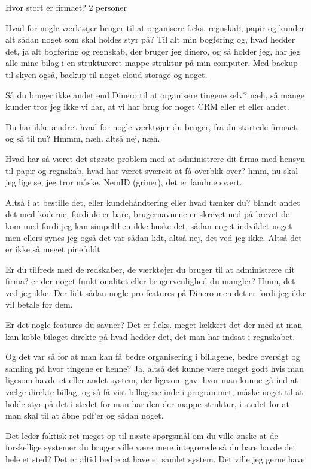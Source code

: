 Hvor stort er firmaet?
2 personer

Hvad for nogle værktøjer bruger til at organisere f.eks. regnskab, papir og kunder alt sådan noget som skal holdes styr på?
Til alt min bogføring og, hvad hedder det, ja alt bogføring og regnskab, der bruger jeg dinero, og så holder jeg, har jeg alle mine bilag i en struktureret mappe struktur på min computer. Med backup til skyen også, backup til noget cloud storage og noget.

Så du bruger ikke andet end Dinero til at organisere tingene selv?
næh, så mange kunder tror jeg ikke vi har, at vi har brug for noget CRM eller et eller andet.

Du har ikke ændret hvad for nogle værktøjer du bruger, fra du startede firmaet, og så til nu?
Hmmm, næh. altså nej, næh.

Hvad har så været det største problem med at administrere dit firma med hensyn til papir og regnskab, hvad har været sværest at få overblik over?
hmm, nu skal jeg lige se, jeg tror måske. NemID (griner), det er fandme svært.

Altså i at bestille det, eller kundehåndtering eller hvad tænker du?
blandt andet det med koderne, fordi de er bare, brugernavnene er skrevet ned på brevet de kom med fordi jeg kan simpelthen ikke huske det, sådan noget indviklet noget men ellers synes jeg også det var sådan lidt, altså nej, det ved jeg ikke. Altså det er ikke så meget pinefuldt

Er du tilfreds med de redskaber, de værktøjer du bruger til at administrere dit firma? er der noget funktionalitet eller brugervenlighed du mangler?
Hmm, det ved jeg ikke. Der lidt sådan nogle pro features på Dinero men det er fordi jeg ikke vil betale for dem.

Er det nogle features du savner?
Det er f.eks. meget lækkert det der med at man kan koble bilaget direkte på hvad hedder det, det man har indsat i regnskabet.

Og det var så for at man kan få  bedre organisering i billagene, bedre oversigt og samling på hvor tingene er henne?
Ja, altså det kunne være meget godt hvis man ligesom havde et eller andet system, der ligesom gav, hvor man kunne gå ind at vælge direkte billag, og så få vist billagene inde i programmet, måske noget til at holde styr på det i stedet for man har den der mappe struktur, i stedet for at man skal til at åbne pdf’er og sådan noget.

Det leder faktisk ret meget op til næste spørgsmål om du ville ønske at de forskellige systemer du bruger ville være mere integrerede så du bare havde det hele et sted?
Det er altid bedre at have et samlet system. Det ville jeg gerne have

